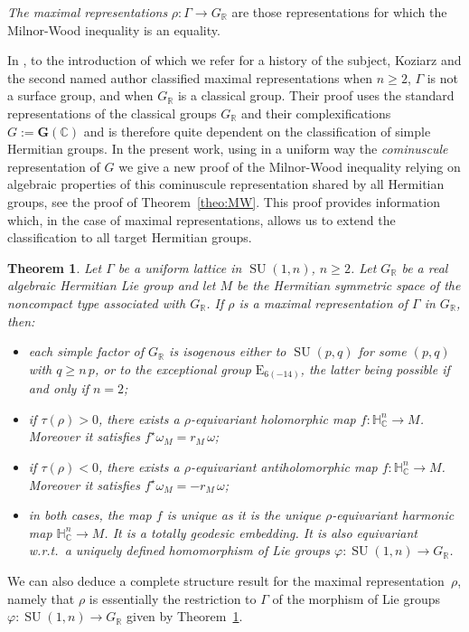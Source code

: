 \documentclass[10pt]{amsart}
\theoremstyle{plain}
\newtheorem{theoA}{Theorem}
\theoremstyle{definition}
\DeclareMathOperator{\SU}{SU}
\newcommand{\bC}{\mathbb{C}}
\newcommand{\bR}{\mathbb{R}}
\newcommand{\HC}{{\mathbb{H}^n_\mathbb{C}}}
\newcommand{\bfG}{\boldsymbol{G}}
\newcommand{\rkm}{{r_M}}
\begin{document}
\emph{The maximal representations} $\rho:\Gamma\to G_\bR$ are those representations
for which the Milnor-Wood inequality is an equality.

In \cite{KM}, to the introduction of which we refer for a history of the subject, Koziarz and the
second named author classified maximal representations when $n\geq 2$, \ie $\Gamma$ is not a surface
group, and when $G_\bR$ is a classical group.
Their proof uses the standard representations of the classical groups $G_\bR$ and their
complexifications $G:=\bfG(\bC)$ and is therefore quite dependent on the classification of simple
Hermitian groups.
In the present work, using in a uniform way the \emph{cominuscule} representation of $G$
we give a new proof of the Milnor-Wood inequality relying on
algebraic properties of this cominuscule representation shared by all Hermitian groups,
see the proof of Theorem~\ref{theo:MW}.
This proof provides information which,
in the case of maximal representations, allows us to extend
the classification to all target Hermitian groups.


\begin{theoA}
\label{maintheo}
Let $\Gamma$ be a uniform lattice in $\SU(1,n)$, $n\geq 2$.
Let $G_\bR$ be a real algebraic Hermitian Lie group and let $M$ be the Hermitian symmetric space of
the noncompact type associated with $G_\bR$. If $\rho$ is a maximal
representation of $\Gamma$ in $G_\bR$, then:
\begin{itemize}
\item each simple factor of $G_\bR$ is isogenous either to
$\SU(p,q)$ for some $(p,q)$ with $q\geq n\, p$,
or to the exceptional group $\mathrm{E}_{6(-14)}$, the latter being possible if and only if $n=2$;
\item if $\tau(\rho)>0$, there exists a
$\rho$-equivariant holomorphic map $f:\HC\to M$. Moreover it satisfies
$f^\star\omega_M=\rkm\,\omega$;
\item if $\tau(\rho)<0$, there exists a $\rho$-equivariant antiholomorphic map $f:\HC\to
M$. Moreover it satisfies $f^\star\omega_M=-\rkm\,\omega$;
\item in both cases, the map $f$ is unique as it is the unique $\rho$-equivariant harmonic map $\HC\to
M$. It
is a totally geodesic embedding. It is also equivariant w.r.t.\
a uniquely defined homomorphism of Lie groups $\varphi: \SU(1,n)\to G_\bR$.
\end{itemize}
\end{theoA}


We can also deduce a complete structure result
for the maximal representation~$\rho$, namely that $\rho$ is essentially the restriction to $\Gamma$ of
the morphism of Lie
groups \hbox{$\varphi: \SU(1,n) \to G_\bR$} given by Theorem~\ref{maintheo}.
\end{document}
